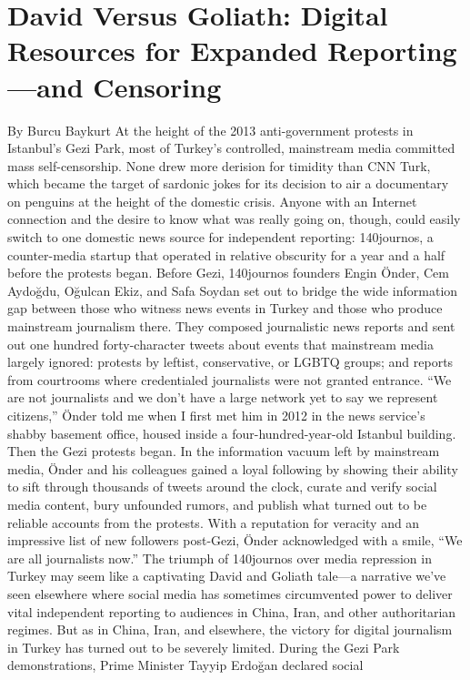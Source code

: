 \chapter{David Versus Goliath: Digital Resources for Expanded Reporting—and Censoring}
By Burcu Baykurt
At the height of the 2013 anti-government protests in Istanbul’s Gezi Park, most of
Turkey’s controlled, mainstream media committed mass self-censorship. None drew
more derision for timidity than CNN Turk, which became the target of sardonic jokes for
its decision to air a documentary on penguins at the height of the domestic crisis.
Anyone with an Internet connection and the desire to know what was really going on,
though, could easily switch to one domestic news source for independent reporting:
140journos, a counter-media startup that operated in relative obscurity for a year and a
half before the protests began.
Before Gezi, 140journos founders Engin Önder, Cem Aydoğdu, Oğulcan Ekiz, and Safa
Soydan set out to bridge the wide information gap between those who witness news
events in Turkey and those who produce mainstream journalism there. They composed
journalistic news reports and sent out one hundred forty-character tweets about events
that mainstream media largely ignored: protests by leftist, conservative, or LGBTQ
groups; and reports from courtrooms where credentialed journalists were not granted
entrance. ``We are not journalists and we don’t have a large network yet to say we
represent citizens,'' Önder told me when I first met him in 2012 in the news service’s
shabby basement office, housed inside a four-hundred-year-old Istanbul building.
Then the Gezi protests began. In the information vacuum left by mainstream media,
Önder and his colleagues gained a loyal following by showing their ability to sift through
thousands of tweets around the clock, curate and verify social media content, bury
unfounded rumors, and publish what turned out to be reliable accounts from the protests.
With a reputation for veracity and an impressive list of new followers post-Gezi, Önder
acknowledged with a smile, ``We are all journalists now.''
The triumph of 140journos over media repression in Turkey may seem like a captivating
David and Goliath tale—a narrative we’ve seen elsewhere where social media has
sometimes circumvented power to deliver vital independent reporting to audiences in
China, Iran, and other authoritarian regimes. But as in China, Iran, and elsewhere, the
victory for digital journalism in Turkey has turned out to be severely limited.
During the Gezi Park demonstrations, Prime Minister Tayyip Erdoğan declared social
